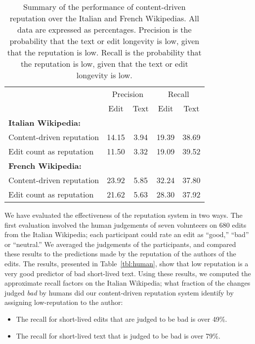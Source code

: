 \begin{table}
\begin{center}
\begin{tabular}{|l||c|c||c|c|} \hline
 & \multicolumn{2}{|c||}{Precision}
 & \multicolumn{2}{|c|}{Recall} \\
 & Edit & Text & Edit & Text \\[0.5ex] \hline
\textbf{Italian Wikipedia:} & & & &    \\
\qquad Content-driven reputation & 14.15 &  3.94 & 19.39 & 38.69 \\
\qquad Edit count as reputation  & 11.50 &  3.32 & 19.09 & 39.52 \\ \hline
\textbf{French Wikipedia:} & & & & \\
\qquad Content-driven reputation & 23.92 &  5.85 & 32.24 & 37.80 \\
\qquad Edit count as reputation &  21.62 &  5.63 & 28.30 & 37.92 \\ \hline
\end{tabular}
\end{center}
\caption{Summary of the performance of content-driven reputation over
the Italian and French Wikipedias. All data are expressed as percentages.
Precision is the probability that the text or edit longevity is low,
given that the reputation is low.
Recall is the probability that the reputation is low, given that
the text or edit longevity is low.
}
\label{tbl:comparison-with-count}
\end{table}



We have evaluated the effectiveness of the
reputation system in two ways.
The first evaluation involved the human judgements of seven volunteers on
680 edits from the Italian Wikipedia;
each participant could rate
an edit as ``good,'' ``bad'' or ``neutral.''
We averaged the judgements of the participants, and
compared these results to the predictions made
by the reputation of the authors of the edits.
The results, presented in Table~\ref{tbl:human},
show that low reputation is a very good predictor
of bad short-lived text.
Using these results, we computed the approximate
recall factors on the Italian Wikipedia; what fraction
of the changes judged \textit{bad} by humans did our
content-driven reputation system identify by assigning low-reputation
to the author:
\begin{itemize}
\item The recall for short-lived edits that are judged to
    be bad is over 49\%.
\item The recall for short-lived text that is judged to
    be bad is over 79\%.
\end{itemize}

